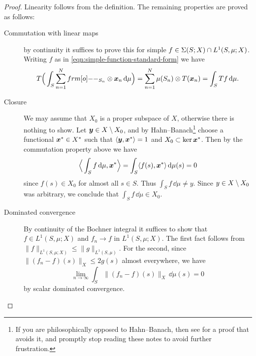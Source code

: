 \begin{proof}
  Linearity follows from the definition.
  The remaining properties are proved as follows:
  
  \begin{description}
 
    \item[Commutation with linear maps] by continuity it suffices to prove this for simple $f \in \Sigma(S;X) \cap L^1(S,\mu;X)$.
    Writing $f$ as in \eqref{eqn:simple-function-standard-form} we have 
    \begin{equation*}
        T\Big(\int_S \sum_{n=1}^N \1_{S_n} \otimes \mb{x}_n \, \dd\mu \Big)
        = \sum_{n=1}^N \mu(S_n) \otimes T(\mb{x}_n) 
        = \int_S Tf \, \dd\mu.
    \end{equation*}
        
  \item[Closure] We may assume that $X_0$ is a proper subspace of $X$, otherwise there is nothing to show.
    Let $\bm{y} \in X \setminus X_0$, and by Hahn--Banach\footnote{If you are philosophically opposed to Hahn--Banach, then see \cite[Corollary 1.1.22]{HNVW16} for a proof that avoids it, and promptly stop reading these notes to avoid further frustration.} choose a functional $\bm{x}^* \in X^*$ such that $\langle \bm{y}, \bm{x}^* \rangle = 1$ and $X_0 \subset \ker \bm{x}^*$.
    Then by the commutation property above we have
    \begin{equation*}
      \Big\langle \int_S f \, \mathrm{d}\mu, \bm{x}^* \Big\rangle = \int_S \langle f(s), \bm{x}^* \rangle \, \mathrm{d}\mu(s) = 0
    \end{equation*}
    since $f(s) \in X_0$ for almost all $s \in S$.
    Thus $\int_S f \, \dd\mu \neq y$.
    Since $y \in X \setminus X_0$ was arbitrary, we conclude that $\int_S f \, \dd\mu \in X_0$.

  \item[Dominated convergence]
    By continuity of the Bochner integral it suffices to show that $f \in L^1(S,\mu;X)$ and  $f_n \to f$ in $L^1(S,\mu;X)$.
    The first fact follows from $\|f\|_{L^1(S,\mu;X)} \leq \|g\|_{L^1(S,\mu)}$.
    For the second, since $\|(f_n - f)(s)\|_X \leq 2g(s)$ almost everywhere, we have
    \begin{equation*}
      \lim_{n \to \infty} \int_S \|(f_n - f)(s)\|_X \, \dd\mu(s) = 0
    \end{equation*}
    by scalar dominated convergence.


\end{description}
\end{proof}

